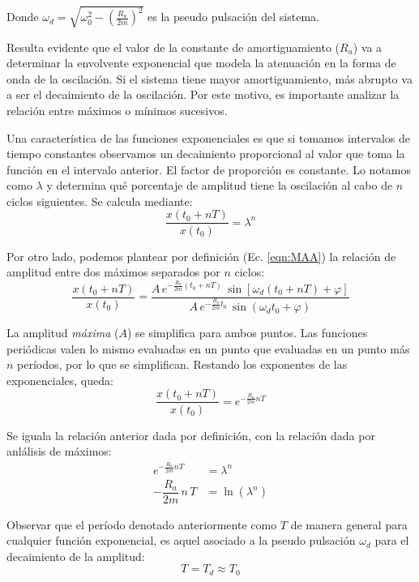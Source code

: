 \documentclass[a5paper,12pt,twoside]{book}
\begin{document}
Donde $\omega_d=\sqrt{\omega_0^2 - \left(\tfrac{R_a}{2m}\right)^2 }$ es la pseudo pulsación del sistema.

Resulta evidente que el valor de la constante de amortiguamiento ($R_a$) va a determinar la envolvente exponencial que modela la atenuación en la forma de onda de la oscilación.
Si el sistema tiene mayor amortiguamiento, más abrupto va a ser el decaimiento de la oscilación.
Por este motivo, es importante analizar la relación entre máximos o mínimos sucesivos.

Una característica de las funciones exponenciales es que si tomamos intervalos de tiempo constantes observamos un decaimiento proporcional al valor que toma la función en el intervalo anterior.
El factor de proporción es constante.
Lo notamos como $\lambda$ y determina qué porcentaje de amplitud tiene la oscilación al cabo de $n$ ciclos siguientes.
Se calcula mediante:
\begin{equation*}
    \dfrac{x(t_0+nT)}{x(t_0)}=\lambda^n
\end{equation*}

Por otro lado, podemos plantear por definición (Ec. \ref{eqn:MAA}) la relación de amplitud entre dos máximos separados por $n$ ciclos:
\begin{equation*}
    \dfrac{x(t_0+nT)}{x(t_0)} = \dfrac
    {A\,e^{-\tfrac{R_a}{2m}(t_0+nT)} \, \sin \left[\omega_d (t_0+nT)+\varphi \right]}
    {A\,e^{-\tfrac{R_a}{2m} t_0} \, \sin \left(\omega_d t_0+\varphi \right)}
\end{equation*}

La amplitud \emph{máxima} ($A$) se simplifica para ambos puntos.
Las funciones periódicas valen lo mismo evaluadas en un punto que evaluadas en un punto más $n$ períodos, por lo que se simplifican.
Restando los exponentes de las exponenciales, queda:
\begin{equation*}
    \dfrac{x(t_0+nT)}{x(t_0)} = e^{-\tfrac{R_a}{2m} n T}
\end{equation*}

Se iguala la relación anterior dada por definición, con la relación dada por anlálisis de máximos:
\begin{align*}
    e^{-\tfrac{R_a}{2m} nT} &= \lambda^n
    \\
    -\dfrac{R_a}{2m} \, n \, T &= \ln (\lambda^n)
\end{align*}

Observar que el período denotado anteriormente como $T$ de manera general para cualquier función exponencial, es aquel asociado a la pseudo pulsación $\omega_d$ para el decaimiento de la amplitud:
\begin{equation*}
    T = T_d \approx T_0
\end{equation*}
\end{document}
